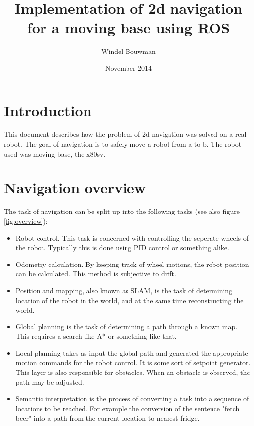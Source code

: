 \documentclass[a4paper]{article}
\begin{document}
\title{Implementation of 2d navigation for a moving base using ROS}
\date{November 2014}
\author{Windel Bouwman}

\maketitle

\tableofcontents

\section{Introduction}

This document describes how the problem of 2d-navigation was solved on a real robot.
The goal of navigation is to safely move a robot from a to b. The robot used
was moving base, the x80sv.

\section{Navigation overview}

The task of navigation can be split up into the following tasks (see also figure \ref{fig:overview}):

\begin{itemize}
  \item Robot control. This task is concerned with controlling the seperate wheels of the robot. Typically this is done using PID control or something alike.
  \item Odometry calculation. By keeping track of wheel motions, the robot position can be
calculated. This method is subjective to drift.
  \item Position and mapping, also known as SLAM, is the task of determining location of the robot in the world, and at the same time reconstructing the world.
  \item Global planning is the task of determining a path through a known map. This requires a search like A* or something like that.
  \item Local planning takes as input the global path and generated the appropriate motion commands for the robot control. It is some sort of setpoint generator. This layer is also responsible for obstacles. When an obstacle is observed, the path may be adjusted.
  \item Semantic interpretation is the process of converting a task into a sequence of locations to be reached. For example the conversion of the sentence "fetch beer" into a path from the current location to nearest fridge.
\end{itemize}
\end{document}
